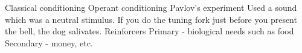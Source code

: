 \markdownRendererUlEndTight \markdownRendererUlItemEnd 
\markdownRendererUlEnd \markdownRendererInterblockSeparator
{}\markdownRendererInterblockSeparator
{}\markdownRendererUlBeginTight
\markdownRendererUlItem Classical conditioning\markdownRendererUlItemEnd 
\markdownRendererUlItem Operant conditioning\markdownRendererUlItemEnd 
\markdownRendererUlItem Pavlov's experiment\markdownRendererInterblockSeparator
{}\markdownRendererUlBeginTight
\markdownRendererUlItem Used a sound which was a neutral stimulus. If you do the tuning fork just before you present the bell, the dog salivates.\markdownRendererUlItemEnd 
\markdownRendererUlEndTight \markdownRendererUlItemEnd 
\markdownRendererUlItem Reinforcers\markdownRendererInterblockSeparator
{}\markdownRendererUlBeginTight
\markdownRendererUlItem Primary - biological needs such as food\markdownRendererUlItemEnd 
\markdownRendererUlItem Secondary - money, etc.\markdownRendererUlItemEnd 
\markdownRendererUlEndTight \markdownRendererUlItemEnd 
\markdownRendererUlEndTight \relax